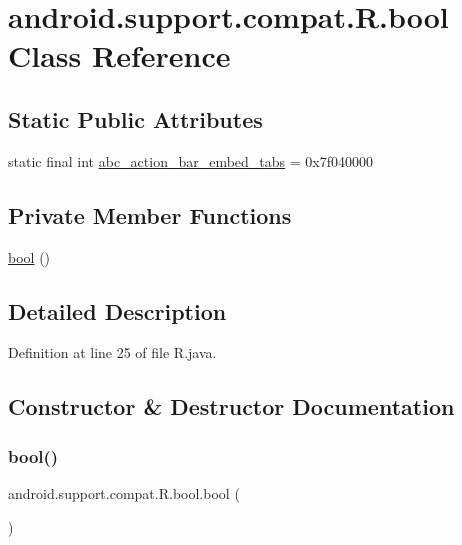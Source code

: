 \hypertarget{classandroid_1_1support_1_1compat_1_1_r_1_1bool}{}\section{android.\+support.\+compat.\+R.\+bool Class Reference}
\label{classandroid_1_1support_1_1compat_1_1_r_1_1bool}
\subsection*{Static Public Attributes}
\begin{DoxyCompactItemize}
\item 
static final int \mbox{\hyperlink{classandroid_1_1support_1_1compat_1_1_r_1_1bool_a2b1c86504041f2552ac19b7856b668f0}{abc\+\_\+action\+\_\+bar\+\_\+embed\+\_\+tabs}} = 0x7f040000
\end{DoxyCompactItemize}
\subsection*{Private Member Functions}
\begin{DoxyCompactItemize}
\item 
\mbox{\hyperlink{classandroid_1_1support_1_1compat_1_1_r_1_1bool_aa6afd08c8cee4b141b2bf7d31046ac7a}{bool}} ()
\end{DoxyCompactItemize}


\subsection{Detailed Description}


Definition at line 25 of file R.\+java.



\subsection{Constructor \& Destructor Documentation}
\mbox{\label{classandroid_1_1support_1_1compat_1_1_r_1_1bool_aa6afd08c8cee4b141b2bf7d31046ac7a}} 
\subsubsection{\texorpdfstring{bool()}{bool()}}
{\footnotesize\ttfamily android.\+support.\+compat.\+R.\+bool.\+bool (\begin{DoxyParamCaption}{ }\end{DoxyParamCaption})\hspace{0.3cm}{\ttfamily [private]}}




